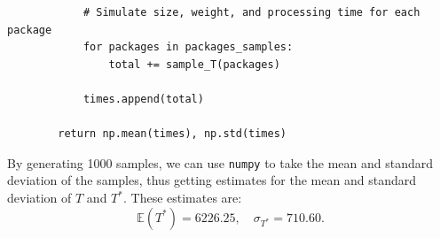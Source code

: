 \documentclass[expanded]{pset}
\begin{document}
\begin{parts}
\begin{verbatim}
            # Simulate size, weight, and processing time for each package
            for packages in packages_samples:
                total += sample_T(packages)

            times.append(total)

        return np.mean(times), np.std(times)
  \end{verbatim}

  By generating 1000 samples, we can use \texttt{numpy} to take the mean and standard deviation of the samples, thus getting estimates for the mean and standard deviation of $T$ and $T^*$. These estimates are:
  \[\mathbb{E}(T^*) = 6226.25, \quad \sigma_{T^*} = 710.60. \]
\end{parts}
\end{document}
